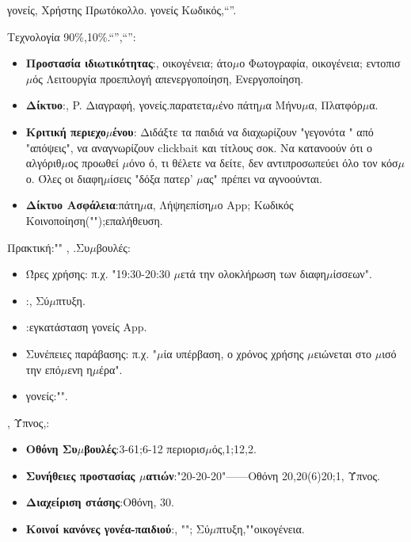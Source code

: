γονείς, Χρήστης Πρωτόκολλο. γονείς Κωδικός,“”.


Τεχνολογία 90\%,10\%.“”,“”:

\begin{itemize}
  \item \textbf{Προστασία ιδιωτικότητας}:, οικογένεια; άτο$\mu$ο Φωτογραφία, οικογένεια; εντοπισ$\mu$ός Λειτουργία προεπιλογή απενεργοποίηση, Ενεργοποίηση.
  \item \textbf{Δίκτυο}:, P. Διαγραφή, γονείς.παρατετα$\mu$ένο πάτη$\mu$α Μήνυ$\mu$α, Πλατφόρ$\mu$α.
  \item \textbf{Κριτική περιεχο$\mu$ένου}: Διδάξτε τα παιδιά να διαχωρίζουν "γεγονότα " από "απόψεις", να αναγνωρίζουν clickbait και τίτλους σοκ. Να κατανοούν ότι ο αλγόριθ$\mu$ος προωθεί $\mu$όνο ό, τι θέλετε να δείτε, δεν αντιπροσωπεύει όλο τον κόσ$\mu$ο. Όλες οι διαφη$\mu$ίσεις "δόξα πατερ' $\mu$ας" πρέπει να αγνοούνται.
  \item \textbf{Δίκτυο Ασφάλεια}:πάτη$\mu$α, Λήψηεπίση$\mu$ο App; Κωδικός Κοινοποίηση("");επαλήθευση.
\end{itemize}

\begin{tcbpractice}{Πρακτική:""}
, .Συ$\mu$βουλές:

\begin{itemize}
  \item Ώρες χρήσης: π.χ. "19:30-20:30 $\mu$ετά την ολοκλήρωση των διαφη$\mu$ίσσεων".
  \item :, Σύ$\mu$πτυξη.
  \item :εγκατάσταση γονείς App.
  \item Συνέπειες παράβασης: π.χ. "$\mu$ία υπέρβαση, ο χρόνος χρήσης $\mu$ειώνεται στο $\mu$ισό την επό$\mu$ενη η$\mu$έρα".
  \item γονείς:"".
\end{itemize}

\end{tcbpractice}


, Ύπνος,:

\begin{itemize}
  \item \textbf{Οθόνη Συ$\mu$βουλές}:3-61;6-12 περιορισ$\mu$ός,1;12,2.
  \item \textbf{Συνήθειες προστασίας $\mu$ατιών}:"20-20-20"——Οθόνη 20,20(6)20;1, Ύπνος.
  \item \textbf{Διαχείριση στάσης}:Οθόνη, 30.
  \item \textbf{Κοινοί κανόνες γονέα-παιδιού}:, ""; Σύ$\mu$πτυξη,""οικογένεια.
\end{itemize}

